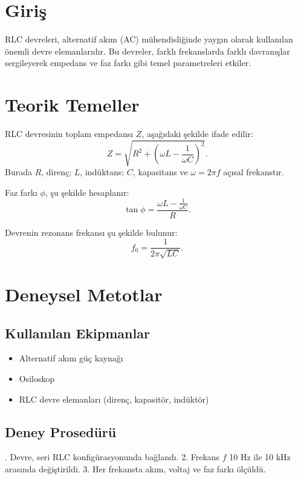 \documentclass[11pt,letterpaper,twocolumn]{article}
\begin{document}
\section{Giriş}
\justify
RLC devreleri, alternatif akım (AC) mühendisliğinde yaygın olarak kullanılan önemli devre elemanlarıdır. Bu devreler, farklı frekanslarda farklı davranışlar sergileyerek empedans ve faz farkı gibi temel parametreleri etkiler. 

\section{Teorik Temeller}
\justify
RLC devresinin toplam empedansı \( Z \), aşağıdaki şekilde ifade edilir:
\begin{equation}
    Z = \sqrt{R^2 + \left( \omega L - \frac{1}{\omega C} \right)^2}.
\end{equation}
Burada \( R \), direnç; \( L \), indüktans; \( C \), kapasitans ve \( \omega = 2\pi f \) açısal frekanstır.

Faz farkı \( \phi \), şu şekilde hesaplanır:
\begin{equation}
    \tan \phi = \frac{\omega L - \frac{1}{\omega C}}{R}.
\end{equation}

Devrenin rezonans frekansı şu şekilde bulunur:
\begin{equation}
    f_0 = \frac{1}{2\pi \sqrt{LC}}.
\end{equation}

\section{Deneysel Metotlar}
\subsection{Kullanılan Ekipmanlar}
\begin{itemize}
    \item Alternatif akım güç kaynağı
    \item Osiloskop
    \item RLC devre elemanları (direnç, kapasitör, indüktör)
\end{itemize}

\subsection{Deney Prosedürü}
. Devre, seri RLC konfigürasyonunda bağlandı.  
2. Frekans \( f \) 10 Hz ile 10 kHz arasında değiştirildi.  
3. Her frekansta akım, voltaj ve faz farkı ölçüldü.
\end{document}
